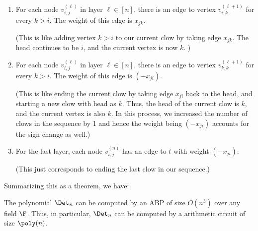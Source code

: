 \begin{enumerate}
\item For each node $v_{i,j}^{(\ell)}$ in layer $\ell \in [n]$, there is an edge to vertex $v_{i,k}^{(\ell+1)}$ for every $k > i$.
The weight of this edge is $x_{jk}$.

(This is like adding vertex $k > i$ to our current clow by taking edge $x_{jk}$.
The head continues to be $i$, and the current vertex is now $k$. )
\item For each node $v_{i,j}^{(\ell)}$ in layer $\ell \in [n]$, there is an edge to vertex $v_{k,k}^{(\ell+1)}$ for every $k > i$.
The weight of this edge is $(-x_{ji})$.

(This is like ending the current clow by taking edge $x_{ji}$ back to the head, and starting a new clow with head as $k$.
Thus, the head of the current clow is $k$, and the current vertex is also $k$.
In this process, we increased the number of clows in the sequence by 1 and hence the weight being $(-x_{ji})$ accounts for the sign change as well.)

\item For the last layer, each node $v_{i,j}^{(n)}$ has an edge to $t$ with weight $(-x_{ji})$.

(This just corresponds to ending the last clow in our sequence.)
\end{enumerate}


\noindent
Summarizing this as a theorem, we have:

\begin{theorem}[\cite{mv97}]\label{thm:det-abp}
The polynomial $\Det_n$ can be computed by an ABP of size $O(n^3)$ over any field $\F$.
Thus, in particular, $\Det_n$ can be computed by a arithmetic circuit of size $\poly(n)$.
\end{theorem}


